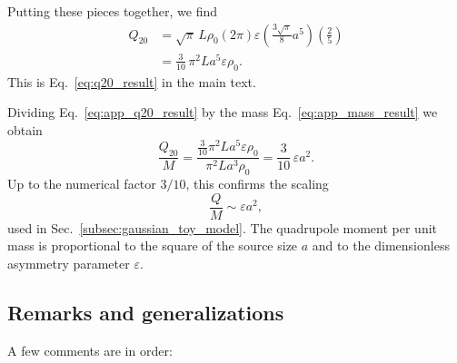 \documentclass[12pt]{article}
\begin{document}
Putting these pieces together, we find
\begin{align}
  Q_{20}
  &= \sqrt{\pi}\,L\rho_0
     (2\pi)\varepsilon
     \left(\frac{3\sqrt{\pi}}{8}a^5\right)
     \left(\frac{2}{5}\right)
  \\
  &= \frac{3}{10}\,\pi^2 L a^5 \varepsilon \rho_0.
  \label{eq:app_q20_result}
\end{align}
This is Eq.~\eqref{eq:q20_result} in the main text.

Dividing Eq.~\eqref{eq:app_q20_result} by the mass
Eq.~\eqref{eq:app_mass_result} we obtain
\begin{equation}
  \frac{Q_{20}}{M}
  = \frac{\frac{3}{10}\pi^2 L a^5 \varepsilon \rho_0}
         {\pi^2 L a^3 \rho_0}
  = \frac{3}{10}\,\varepsilon a^2.
  \label{eq:app_q_over_m}
\end{equation}
Up to the numerical factor $3/10$, this confirms the scaling
\begin{equation}
  \frac{Q}{M} \sim \varepsilon a^2,
\end{equation}
used in Sec.~\ref{subsec:gaussian_toy_model}.  The quadrupole moment per
unit mass is proportional to the square of the source size $a$ and to the
dimensionless asymmetry parameter $\varepsilon$.

\subsection{Remarks and generalizations}

A few comments are in order:
\end{document}
